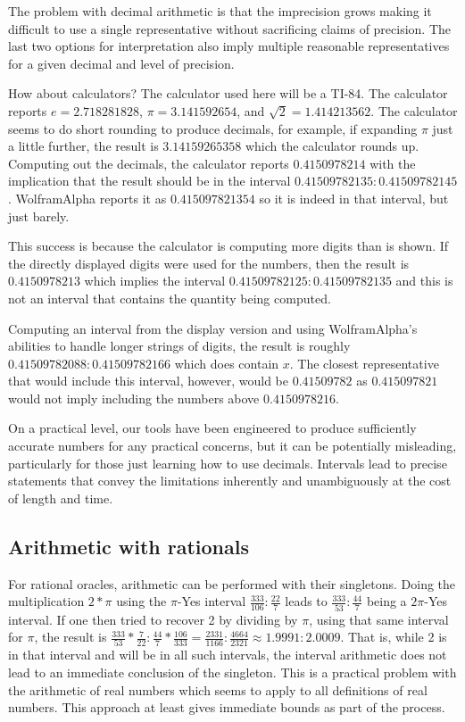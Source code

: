 \documentclass[12pt]{article}
\theoremstyle{remark}
\begin{document}
The problem with decimal arithmetic is that the imprecision grows making it difficult to use a single representative without sacrificing claims of precision. The last two options for interpretation also imply multiple reasonable representatives for a given decimal and level of precision. 

How about calculators? The calculator used here will be a TI-84. The calculator reports  $e = 2.718281828$, $\pi = 3.141592654$, and $\sqrt{2} = 1.414213562$. The calculator seems to do short rounding to produce decimals, for example, if expanding $\pi $ just a little further, the result is  $3.14159265358$ which the calculator rounds up. Computing out the decimals, the calculator reports $0.4150978214$ with the implication that the result should be in the interval $0.41509782135:0.41509782145$.  WolframAlpha reports it as $0.415097821354$ so it is indeed in that interval, but just barely. 

This success is because the calculator is computing more digits than is shown. If the directly displayed digits were used for the numbers, then the result is $0.4150978213$ which implies the interval $0.41509782125:0.41509782135$ and this is not an interval that contains the quantity being computed. 

Computing an interval from the display version and using WolframAlpha's abilities to handle longer strings of digits, the result is roughly $0.41509782088:0.41509782166$ which does contain $x$. The closest representative that would include this interval, however, would be $0.41509782$ as $0.415097821$ would not imply including the numbers above $0.4150978216$. 

On a practical level, our tools have been engineered to produce sufficiently accurate numbers for any practical concerns, but it can be potentially misleading, particularly for those just learning how to use decimals. Intervals lead to precise statements that convey the limitations inherently and unambiguously at the cost of length and time.  

\subsection{Arithmetic with rationals}

For rational oracles, arithmetic can be performed with their singletons. Doing the multiplication $2 * \pi$ using the $\pi$-Yes interval $\frac{333}{106}: \frac{22}{7}$ leads to $\frac{333}{53}: \frac{44}{7}$ being a $2 \pi$-Yes interval. If one then tried to recover 2 by dividing  by $\pi$, using that same interval for $\pi$, the result is $\frac{333}{53} * \frac{7}{22}: \frac{44}{7} * \frac{106}{333} = \frac{2331}{1166}: \frac{4664}{2321} \approx 1.9991: 2.0009$. That is, while 2 is in that interval and will be in all such intervals, the interval arithmetic does not lead to an immediate conclusion of the singleton. This is a practical problem with the arithmetic of real numbers which seems to apply to all definitions of real numbers. This approach at least gives immediate bounds as part of the process.
\end{document}
